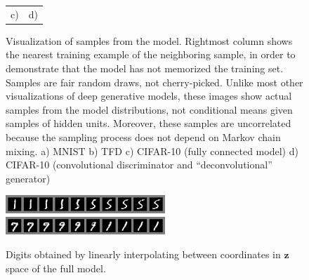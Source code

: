\documentclass{article} %
\begin{document}
\begin{figure}[h]
\begin{tabular}{cc}
 c) & d)
\end{tabular}
\caption{
\small Visualization of samples from the model. Rightmost column shows the
nearest training example of the neighboring sample, in order to demonstrate
that the model has not memorized the training set. Samples are fair random
draws, not cherry-picked. Unlike most other visualizations of deep generative
models, these images show actual samples from the model distributions, not
conditional means given samples of hidden units. Moreover, these samples are
uncorrelated because the sampling process does not depend on Markov chain mixing.
a) MNIST b) TFD c) CIFAR-10 (fully connected model)
d) CIFAR-10 (convolutional discriminator and ``deconvolutional'' generator)
}
\label{fig:visuals1}
\end{figure}

\begin{figure}[h]
\centering
    \includegraphics[width=6cm]{1dsubspace.png} 
    \includegraphics[width=6cm]{1dsubspace2.png} 
    \caption{\small Digits obtained by linearly interpolating between
      coordinates in $\bm{z}$ space of the full model.}
\label{fig:visuals3}
\end{figure}
\end{document}
